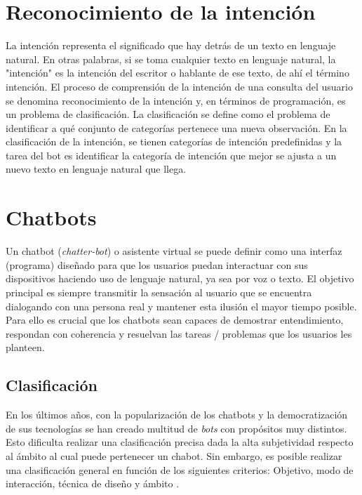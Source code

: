 \section{Reconocimiento de la intención}
La intención representa el significado que hay detrás de un texto en lenguaje natural. En otras palabras, si se toma cualquier texto en lenguaje natural, la "intención" es la intención del escritor o hablante de ese texto, de ahí el término intención. El proceso de comprensión de la intención de una consulta del usuario se denomina reconocimiento de la intención y, en términos de programación, es un problema de clasificación. La clasificación se define como el problema de identificar a qué conjunto de categorías pertenece una nueva observación. En la clasificación de la intención, se tienen categorías de intención predefinidas y la tarea del bot es identificar la categoría de intención que mejor se ajusta a un nuevo texto en lenguaje natural que llega.

\cite{buildingChatbots}

\section{Chatbots}
Un chatbot (\textit{chatter-bot}) o asistente virtual se puede definir como una interfaz (programa) diseñado para que los usuarios puedan interactuar con sus dispositivos haciendo uso de lenguaje natural, ya sea por voz o texto. El objetivo principal es siempre transmitir la sensación al usuario que se encuentra dialogando con una persona real y mantener esta ilusión el mayor tiempo posible. Para ello es crucial que los chatbots sean capaces de demostrar entendimiento, respondan con coherencia y resuelvan las tareas / problemas que los usuarios les planteen.\\

\subsection{Clasificación}
En los últimos años, con la popularización de los chatbots y la democratización de sus tecnologías se han creado multitud de \textit{bots} con propósitos muy distintos. Esto dificulta realizar una clasificación precisa dada la alta subjetividad respecto  al ámbito al cual puede pertenecer un chabot. Sin embargo, es posible realizar una clasificación general en función de los siguientes criterios: Objetivo, modo de interacción, técnica de diseño y ámbito \cite{designTechniques,chatbotTypes}.\\

